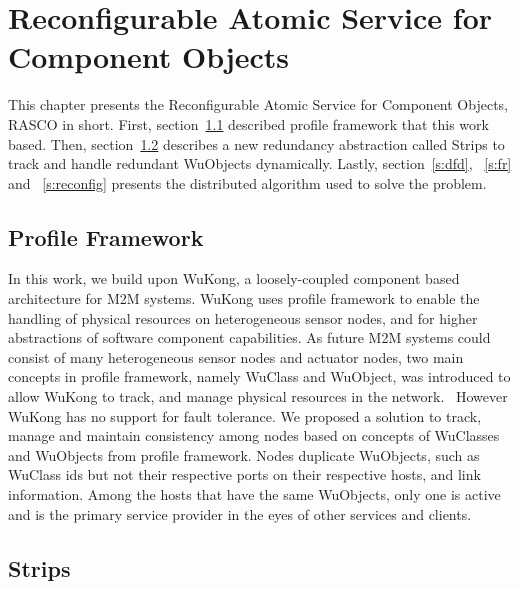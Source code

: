 \cleardoublepage
\singlespacing
\chapter{Reconfigurable Atomic Service for Component Objects}
\label{c:rasco}
\doublespacing\nointerlineskip

This chapter presents the Reconfigurable Atomic Service for Component Objects,
RASCO in short. First, section~\ref{s:pf} described profile framework that this work based. Then, section~\ref{s:ss} describes a new redundancy abstraction called Strips to track and handle redundant WuObjects dynamically. Lastly, section~\ref{s:dfd}, ~\ref{s:fr} and ~\ref{s:reconfig} presents the distributed algorithm used to solve the problem. %

\section{Profile Framework}
\label{s:pf}

In this work, we build upon WuKong, a loosely-coupled component based
architecture for M2M systems. WuKong uses profile
framework to enable the handling of physical resources on heterogeneous sensor
nodes, and for higher abstractions of software component capabilities. As
future M2M systems could consist of many heterogeneous sensor nodes and
actuator nodes, two main concepts in profile framework, namely WuClass and
WuObject, was introduced to allow WuKong to track, and manage physical
resources in the network.~\cite{Reijers} However WuKong has no support for
fault tolerance. We proposed a solution to track, manage and maintain
consistency among nodes based on concepts of WuClasses and WuObjects from
profile framework. Nodes duplicate WuObjects, such as WuClass ids but not
their respective ports on their respective hosts, and link information. Among
the hosts that have the same WuObjects, only one is active and is the primary
service provider in the eyes of other services and clients.

\section{Strips} %
\label{s:ss}


